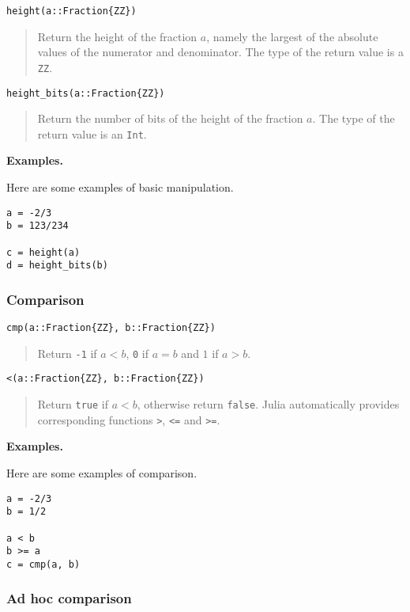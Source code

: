 \documentclass[a4paper,10pt]{article}
\newcommand{\code}{\lstinline}
\newcommand{\desc}[1]{\vspace{-3mm}\begin{quote}#1\end{quote}}
\begin{document}
{{{\begin{lstlisting}
height(a::Fraction{ZZ})
\end{lstlisting}

\desc{Return the height of the fraction $a$, namely the largest of the absolute
values of the numerator and denominator. The type of the return value is a 
\code{ZZ}.}

\begin{lstlisting}
height_bits(a::Fraction{ZZ})
\end{lstlisting}

\desc{Return the number of bits of the height of the fraction $a$. The type of
the return value is an \code{Int}.}

\textbf{Examples.}

Here are some examples of basic manipulation.

\begin{lstlisting}
a = -2/3
b = 123/234

c = height(a)
d = height_bits(b)
\end{lstlisting}

\subsubsection{Comparison}

\begin{lstlisting}
cmp(a::Fraction{ZZ}, b::Fraction{ZZ}) 
\end{lstlisting}

\desc{Return \code{-1} if $a < b$, \code{0} if $a = b$ and $1$ if $a > b$.}

\begin{lstlisting}
<(a::Fraction{ZZ}, b::Fraction{ZZ}) 
\end{lstlisting}

\desc{Return \code{true} if $a < b$, otherwise return \code{false}. Julia
automatically provides corresponding functions \code{>}, \code{<=} and
\code{>=}.}

\textbf{Examples.}

Here are some examples of comparison.

\begin{lstlisting}
a = -2/3
b = 1/2

a < b
b >= a
c = cmp(a, b)
\end{lstlisting}

\subsubsection{Ad hoc comparison}

}}}
\end{document}

